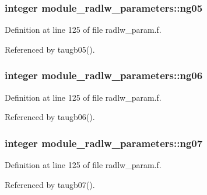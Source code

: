 \subsubsection[{\texorpdfstring{ng05}{ng05}}]{\setlength{\rightskip}{0pt plus 5cm}integer module\+\_\+radlw\+\_\+parameters\+::ng05}\hypertarget{namespacemodule__radlw__parameters_a1e70690afc3ba2cca4344d6df3d26ee8}{}\label{namespacemodule__radlw__parameters_a1e70690afc3ba2cca4344d6df3d26ee8}


Definition at line 125 of file radlw\+\_\+param.\+f.



Referenced by taugb05().

\subsubsection[{\texorpdfstring{ng06}{ng06}}]{\setlength{\rightskip}{0pt plus 5cm}integer module\+\_\+radlw\+\_\+parameters\+::ng06}\hypertarget{namespacemodule__radlw__parameters_a9a176786a0df1e65165db9b3c6f0e582}{}\label{namespacemodule__radlw__parameters_a9a176786a0df1e65165db9b3c6f0e582}


Definition at line 125 of file radlw\+\_\+param.\+f.



Referenced by taugb06().

\subsubsection[{\texorpdfstring{ng07}{ng07}}]{\setlength{\rightskip}{0pt plus 5cm}integer module\+\_\+radlw\+\_\+parameters\+::ng07}\hypertarget{namespacemodule__radlw__parameters_ab8f22f9ceabf3946452055c461476d49}{}\label{namespacemodule__radlw__parameters_ab8f22f9ceabf3946452055c461476d49}


Definition at line 125 of file radlw\+\_\+param.\+f.



Referenced by taugb07().

